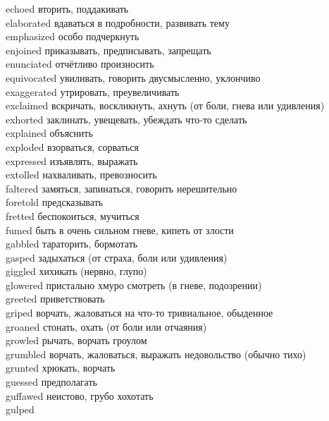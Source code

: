 \documentclass[a4paper,12pt,fleqn]{book}\usepackage{polyglossia}\setdefaultlanguage[babelshorthands=true]{russian}\setotherlanguage{english}\defaultfontfeatures{Ligatures=TeX,Mapping=tex-text}\usepackage{xcolor}\newcommand{\ml}[3]{#2}
\begin{document}
{echoed \hfill вторить, поддакивать\\
elaborated \hfill вдаваться в подробности, развивать тему\\
emphasized \hfill особо подчеркнуть\\
enjoined \hfill приказывать, предписывать, запрещать\\
enunciated \hfill отчётливо произносить\\
equivocated \hfill увиливать, говорить двусмысленно, уклончиво\\
exaggerated \hfill утрировать, преувеличивать\\
exclaimed \hfill вскричать, воскликнуть, ахнуть (от боли, гнева или удивления)\\
exhorted \hfill заклинать, увещевать, убеждать что-то сделать\\
explained \hfill объяснить\\
exploded \hfill взорваться, сорваться\\
expressed \hfill изъявлять, выражать\\
extolled \hfill нахваливать, превозносить\\
faltered \hfill замяться, запинаться, говорить нерешительно\\
foretold \hfill предсказывать\\
fretted \hfill беспокоиться, мучиться\\
fumed \hfill быть в очень сильном гневе, кипеть от злости\\
gabbled \hfill тараторить, бормотать\\
gasped \hfill задыхаться (от страха, боли или удивления)\\
giggled \hfill хихикать (нервно, глупо)\\
glowered \hfill пристально хмуро смотреть (в гневе, подозрении)\\
greeted \hfill приветствовать\\
griped \hfill ворчать, жаловаться на что-то тривиальное, обыденное\\
groaned \hfill стонать, охать (от боли или отчаяния)\\
growled \hfill рычать, ворчать гроулом\\
grumbled \hfill ворчать, жаловаться, выражать недовольство (обычно тихо)\\
grunted \hfill хрюкать, ворчать\\
guessed \hfill предполагать\\
guffawed \hfill неистово, грубо хохотать\\
gulped \hfill \\
}
\end{document}
